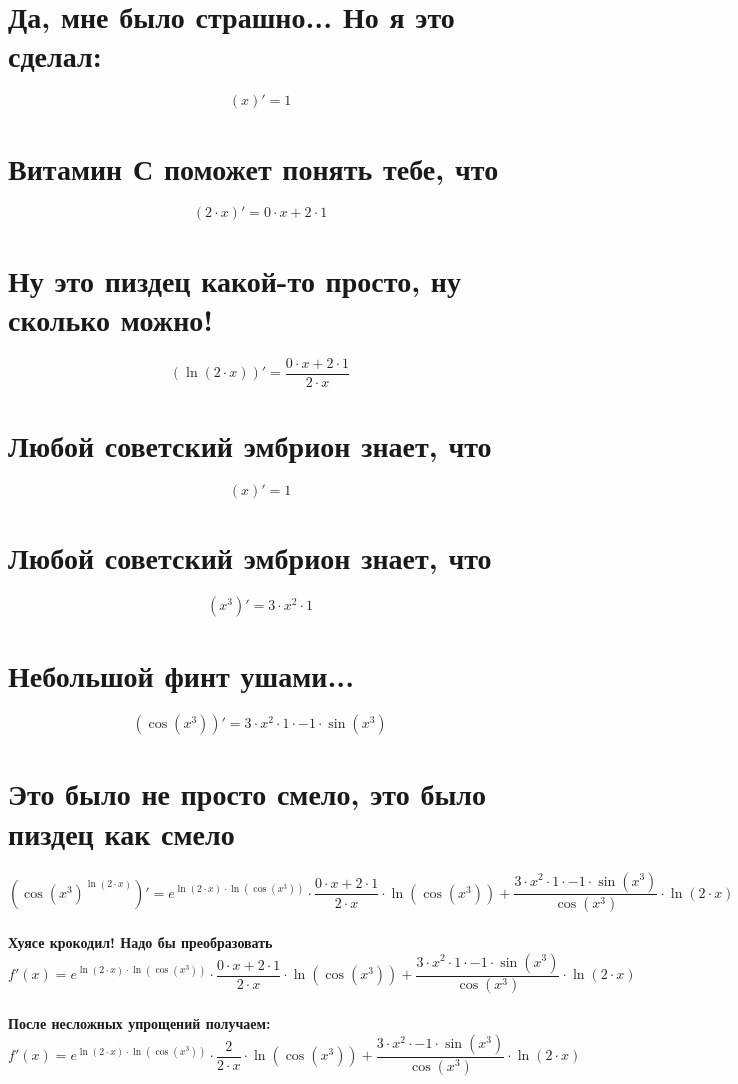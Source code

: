 \documentclass{article}
\begin{document}
\begin{Large}
\begin{onehalfspace}
\section*{Да, мне было страшно... Но я это сделал:}
$$(x)' = 1$$
\section*{Витамин С поможет понять тебе, что}
$$(2 \cdot x)' = 0 \cdot x + 2 \cdot 1$$
\section*{Ну это пиздец какой-то просто, ну сколько можно!}
$$(\ln(2 \cdot x))' = \frac{0 \cdot x + 2 \cdot 1}{2 \cdot x}$$
\section*{Любой советский эмбрион знает, что}
$$(x)' = 1$$
\section*{Любой советский эмбрион знает, что}
$$(x^{3})' = 3 \cdot x^{2} \cdot 1$$
\section*{Небольшой финт ушами...}
$$(\cos(x^{3}))' = 3 \cdot x^{2} \cdot 1 \cdot -1 \cdot \sin(x^{3})$$
\section*{Это было не просто смело, это было пиздец как смело}
$$(\cos(x^{3})^{\ln(2 \cdot x)})' = e^{\ln(2 \cdot x) \cdot \ln(\cos(x^{3}))} \cdot \frac{0 \cdot x + 2 \cdot 1}{2 \cdot x} \cdot \ln(\cos(x^{3})) + \frac{3 \cdot x^{2} \cdot 1 \cdot -1 \cdot \sin(x^{3})}{\cos(x^{3})} \cdot \ln(2 \cdot x)$$
\hline \vspace{1cm} \\
\textbf{Хуясе крокодил! Надо бы преобразовать}\\
$$ f'(x) = e^{\ln(2 \cdot x) \cdot \ln(\cos(x^{3}))} \cdot \frac{0 \cdot x + 2 \cdot 1}{2 \cdot x} \cdot \ln(\cos(x^{3})) + \frac{3 \cdot x^{2} \cdot 1 \cdot -1 \cdot \sin(x^{3})}{\cos(x^{3})} \cdot \ln(2 \cdot x)$$\\
\textbf{После несложных упрощений получаем: }\\
$$ f'(x) = e^{\ln(2 \cdot x) \cdot \ln(\cos(x^{3}))} \cdot \frac{2}{2 \cdot x} \cdot \ln(\cos(x^{3})) + \frac{3 \cdot x^{2} \cdot -1 \cdot \sin(x^{3})}{\cos(x^{3})} \cdot \ln(2 \cdot x)$$\\
\end{onehalfspace}
\end{Large}
\end{document}
